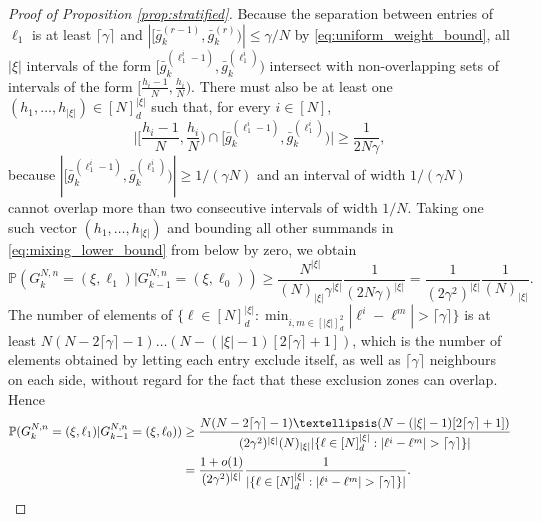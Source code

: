 \documentclass[a4paper,11pt]{article}
\theoremstyle{definition}
\newcommand{\bbP}{\mathbb{P}}
\begin{document}
\begin{proof}[Proof of Proposition \ref{prop:stratified}]
Because the separation between entries of $\ell_1$ is at least $\lceil \gamma \rceil$ and $| [ \bar{ g }_k^{ ( r - 1 ) }, \bar{ g }_k^{ ( r ) } ) | \leq \gamma / N$ by \eqref{eq:uniform_weight_bound}, all $| \xi |$ intervals of the form $[ \bar{ g }_k^{ ( \ell_1^i - 1 ) }, \bar{ g }_k^{ ( \ell_1^i ) } )$ intersect with non-overlapping sets of intervals of the form $[ \frac{ h_i - 1 }{ N }, \frac{ h_i }{ N } )$.
There must also be at least one $( h_1, \ldots, h_{ | \xi | } ) \in [ N ]_d^{ | \xi | }$ such that, for every $i \in [ N ]$,
\begin{equation*}
\Big| \Big[ \frac{ h_i - 1 }{ N }, \frac{ h_i }{ N } \Big) \cap [ \bar{ g }_k^{ ( \ell_1^i - 1 ) }, \bar{ g }_k^{ ( \ell_1^i ) } ) \Big| \geq \frac{ 1 }{ 2 N \gamma },
\end{equation*}
because $| [ \bar{ g }_k^{ ( \ell_1^i - 1 ) }, \bar{ g }_k^{ ( \ell_1^i ) } ) | \geq 1 / ( \gamma N )$ and an interval of width $1 / ( \gamma N )$ cannot overlap more than two consecutive intervals of width $1 / N$.
Taking one such vector $( h_1, \ldots, h_{ | \xi | } )$ and bounding all other summands in \eqref{eq:mixing_lower_bound} from below by zero, we obtain
\begin{equation*}
\bbP( G_k^{ N, n } = ( \xi, \ell_1 ) | G_{ k - 1 }^{ N, n } = ( \xi, \ell_0 )  ) \geq \frac{ N^{ | \xi | } }{ ( N )_{ | \xi | } \gamma^{ | \xi | } } \frac{ 1 }{ ( 2 N \gamma )^{ | \xi | } } = \frac{ 1 }{ ( 2 \gamma^2 )^{ | \xi | } } \frac{ 1 }{ ( N )_{ | \xi | } }.
\end{equation*}
The number of elements of $\{ \ell \in [ N ]_d^{ | \xi | } : \min_{i, m \in [ | \xi | ]_d^2} | \ell^i - \ell^m | > \lceil \gamma \rceil \}$ is at least $N ( N - 2 \lceil \gamma \rceil - 1 ) \ldots ( N - ( | \xi | - 1 ) [ 2 \lceil \gamma \rceil + 1 ] )$, which is the number of elements obtained by letting each entry exclude itself, as well as $\lceil \gamma \rceil$ neighbours on each side, without regard for the fact that these exclusion zones can overlap.
Hence
\begin{align}
\bbP( G_k^{ N, n } = ( \xi, \ell_1 ) | G_{ k - 1 }^{ N, n } = ( \xi, \ell_0 )  ) &\geq \frac{ N ( N - 2 \lceil \gamma \rceil - 1 ) \ldots ( N - ( | \xi | - 1 ) [ 2 \lceil \gamma \rceil + 1 ] ) }{ ( 2 \gamma^2 )^{ | \xi | }  ( N )_{ | \xi | } | \{ \ell \in [ N ]_d^{ | \xi | } : | \ell^i - \ell^m | > \lceil \gamma \rceil \} | } \notag \\
&= \frac{ 1 + o( 1 ) }{ ( 2 \gamma^2 )^{ | \xi | } } \frac{ 1 }{ | \{ \ell \in [ N ]_d^{ | \xi | } : | \ell^i - \ell^m | > \lceil \gamma \rceil \} | }. \label{eq:stratified_minorisation}

\end{align}
\end{proof}
\end{document}
